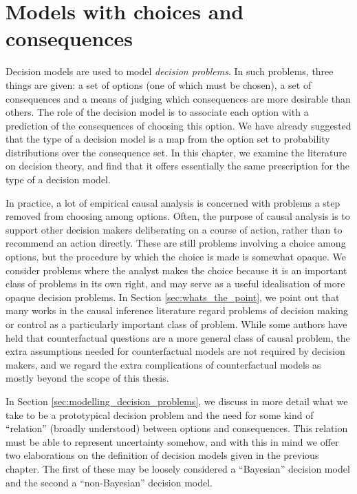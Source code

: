 

\chapter{Models with choices and consequences}\label{ch:2p_statmodels}

Decision models are used to model \emph{decision problems}. In such problems, three things are given: a set of options (one of which must be chosen), a set of consequences and a means of judging which consequences are more desirable than others. The role of the decision model is to associate each option with a prediction of the consequences of choosing this option. We have already suggested that the type of a decision model is a map from the option set to probability distributions over the consequence set. In this chapter, we examine the literature on decision theory, and find that it offers essentially the same prescription for the type of a decision model.

In practice, a lot of empirical causal analysis is concerned with problems a step removed from choosing among options. Often, the purpose of causal analysis is to support other decision makers deliberating on a course of action, rather than to recommend an action directly. These are still problems involving a choice among options, but the procedure by which the choice is made is somewhat opaque.  We consider problems where the analyst makes the choice because it is an important class of problems in its own right, and may serve as a useful idealisation of more opaque decision problems. In Section \ref{sec:whats_the_point}, we point out that many works in the causal inference literature regard problems of decision making or control as a particularly important class of problem. While some authors have held that counterfactual questions are a more general class of causal problem, the extra assumptions needed for counterfactual models are not required by decision makers, and we regard the extra complications of counterfactual models as mostly beyond the scope of this thesis.

In Section \ref{sec:modelling_decision_problems}, we discuss in more detail what we take to be a prototypical decision problem and the need for some kind of ``relation'' (broadly understood) between options and consequences. This relation must be able to represent uncertainty somehow, and with this in mind we offer two elaborations on the definition of decision models given in the previous chapter. The first of these may be loosely considered a ``Bayesian'' decision model and the second a ``non-Bayesian'' decision model.


